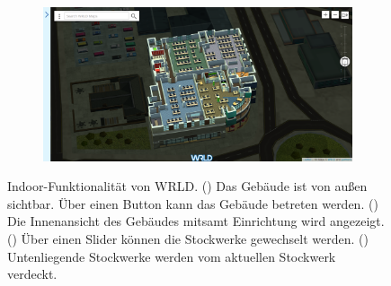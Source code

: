 \begin{figure}[h]
\begin{subfigure}{0.49\textwidth}
        \caption{}
        \label{sfig:wrld_indoor_transition}
    \end{subfigure}
    \hfill
    \begin{subfigure}{0.49\textwidth}
        \includegraphics[width=\textwidth]{figures/wrdl_indoor_2.png}
        \caption{}
        \label{sfig:wrld_indoor_2}
    \end{subfigure}
    \caption{Indoor-Funktionalität von WRLD.\@ %
        () Das Gebäude ist von außen sichtbar. %
        Über einen Button kann das Gebäude betreten werden. %
        () Die Innenansicht des Gebäudes mitsamt Einrichtung wird angezeigt. %
        () Über einen Slider können die Stockwerke gewechselt werden. %
        () Untenliegende Stockwerke werden vom aktuellen Stockwerk verdeckt.%
    }
    \label{fig:wrld_indoor}
\end{figure}

